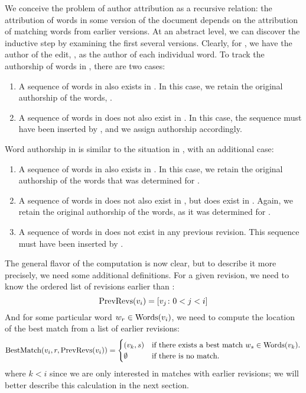 We conceive the problem of author attribution as a recursive relation:
the attribution of words in some version of the document depends on the
attribution of matching words from earlier versions.
At an abstract level, we can discover the inductive step by examining
the first several versions.
Clearly, for , we have the author of the edit,
, as the author of each individual word.
To track the authorship of words in , there are two cases:
\begin{enumerate}
\item A sequence of words in  also exists in .
	In this case, we retain the original authorship of the words,
	.
\item A sequence of words in  does not also exist in .
	In this case, the sequence must have been inserted by
	, and we assign authorship accordingly.
\end{enumerate}
Word authorship in  is similar to the situation in
, with an additional case:
\begin{enumerate}
\item A sequence of words in  also exists in .
	In this case, we retain the original authorship of the words
	that was determined for .
\item A sequence of words in  does not also exist in ,
	but does exist in .
	Again, we retain the original authorship of the words, as it was
	determined for .
\item A sequence of words in  does not exist in any previous
	revision.
	This sequence must have been inserted by .
\end{enumerate}

The general flavor of the computation is now clear, but to describe it
more precisely, we need some additional definitions.
For a given revision, we need to know the ordered list of revisions
earlier than :
\begin{equation}
    \prevrevs{\version{i}} = \left[ \version{j} \colon  0 < j < i \right]
\label{def:prevrevs}
\end{equation}
And for some particular
word $w_r \in \mathrm{Words}(v_{i})$, we need to compute the
location of the best match from a list of earlier revisions:
\begin{equation}
    \match{\version{i}, r, \prevrevs{\version{i}}} =
    \begin{cases}
	(\version{k}, s) & \text{if there exists a best match $w_s \in \words{\version{k}}$.} \\
	\emptyset & \text{if there is no match.} \\
    \end{cases}
\label{def:bestmatch}
\end{equation}
where $k < i$ since we are only interested in matches with earlier revisions;
we will better describe this calculation in the next section.

